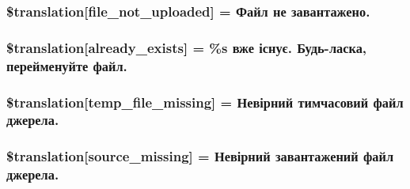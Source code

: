 \subsubsection[{\$translation}]{\setlength{\rightskip}{0pt plus 5cm}\$translation\mbox{[}\textquotesingle{}file\+\_\+not\+\_\+uploaded\textquotesingle{}\mbox{]} = \textquotesingle{}Файл не завантажено.\textquotesingle{}}\label{class_8upload_8uk___u_a_8php_a4ce76e7be0b3a03c2b47f6d70c21832e}
\hypertarget{class_8upload_8uk___u_a_8php_afd84e910217f04139f567c41e292afa5}{}
\subsubsection[{\$translation}]{\setlength{\rightskip}{0pt plus 5cm}\$translation\mbox{[}\textquotesingle{}already\+\_\+exists\textquotesingle{}\mbox{]} = \textquotesingle{}\%s вже існує. Будь-\/ласка, перейменуйте файл.\textquotesingle{}}\label{class_8upload_8uk___u_a_8php_afd84e910217f04139f567c41e292afa5}
\hypertarget{class_8upload_8uk___u_a_8php_ab0fa87a88aba2624004581eed0633325}{}
\subsubsection[{\$translation}]{\setlength{\rightskip}{0pt plus 5cm}\$translation\mbox{[}\textquotesingle{}temp\+\_\+file\+\_\+missing\textquotesingle{}\mbox{]} = \textquotesingle{}Невірний тимчасовий файл джерела.\textquotesingle{}}\label{class_8upload_8uk___u_a_8php_ab0fa87a88aba2624004581eed0633325}
\hypertarget{class_8upload_8uk___u_a_8php_aceaaf7355acaaf10f0ae60378d03c468}{}
\subsubsection[{\$translation}]{\setlength{\rightskip}{0pt plus 5cm}\$translation\mbox{[}\textquotesingle{}source\+\_\+missing\textquotesingle{}\mbox{]} = \textquotesingle{}Невірний завантажений файл джерела.\textquotesingle{}}\label{class_8upload_8uk___u_a_8php_aceaaf7355acaaf10f0ae60378d03c468}
\hypertarget{class_8upload_8uk___u_a_8php_aff2427c72a2598aefa6d58df1dd18b08}{}
